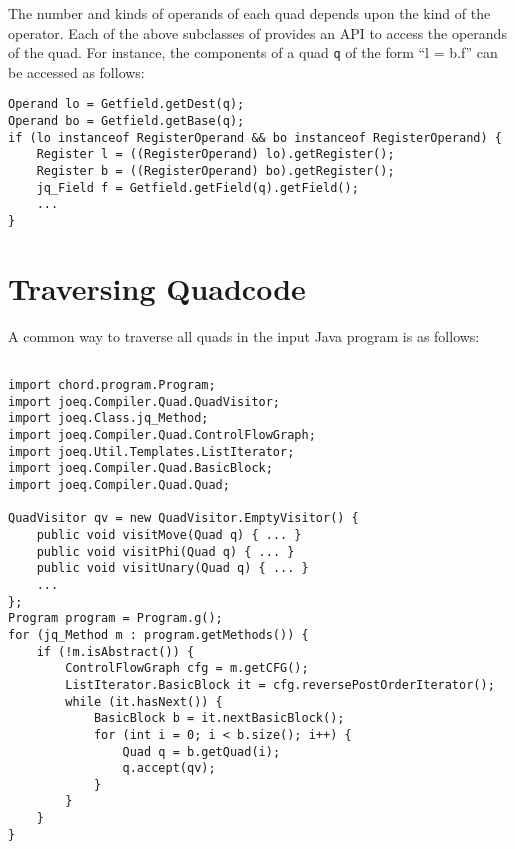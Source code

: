 The number and kinds of operands of each quad depends upon the kind of
the operator.  Each of the above subclasses of 
provides an API to access the operands of the quad.  For instance,
the components of a  quad {\tt q} of the form ``l = b.f'' can be accessed as follows:

\begin{framed}
\begin{verbatim}
Operand lo = Getfield.getDest(q);
Operand bo = Getfield.getBase(q);
if (lo instanceof RegisterOperand && bo instanceof RegisterOperand) {
    Register l = ((RegisterOperand) lo).getRegister();
    Register b = ((RegisterOperand) bo).getRegister();
    jq_Field f = Getfield.getField(q).getField();
    ...
}
\end{verbatim}
\end{framed}

\section{Traversing Quadcode}
\label{sec:traversing}

A common way to traverse all quads in the input Java program is as follows:

\texonly{\newpage}

\begin{framed}
\begin{verbatim}

import chord.program.Program;
import joeq.Compiler.Quad.QuadVisitor;
import joeq.Class.jq_Method;
import joeq.Compiler.Quad.ControlFlowGraph;
import joeq.Util.Templates.ListIterator;
import joeq.Compiler.Quad.BasicBlock;
import joeq.Compiler.Quad.Quad;

QuadVisitor qv = new QuadVisitor.EmptyVisitor() {
    public void visitMove(Quad q) { ... }
    public void visitPhi(Quad q) { ... }
    public void visitUnary(Quad q) { ... }
    ...
};
Program program = Program.g();
for (jq_Method m : program.getMethods()) {
    if (!m.isAbstract()) {
        ControlFlowGraph cfg = m.getCFG();
        ListIterator.BasicBlock it = cfg.reversePostOrderIterator();
        while (it.hasNext()) {
            BasicBlock b = it.nextBasicBlock();
            for (int i = 0; i < b.size(); i++) {
                Quad q = b.getQuad(i);
                q.accept(qv);
            }
        }
    }
}
\end{verbatim}
\end{framed}

